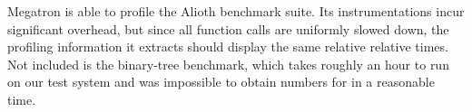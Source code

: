 \documentclass{article}
\begin{document}
Megatron is able to profile the Alioth benchmark suite. Its instrumentations incur significant overhead, but since all function calls are uniformly slowed down, the profiling information it extracts should display the same relative relative times. Not included is the binary-tree benchmark, which takes roughly an hour to run on our test system and was impossible to obtain numbers for in a reasonable time. 
\end{document}
